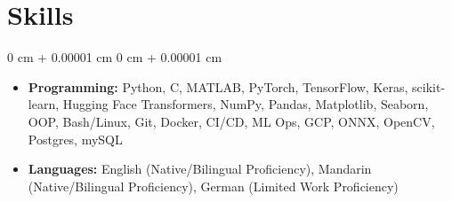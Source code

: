 \documentclass[11pt, letterpaper]{article}
\newenvironment{highlights}{
    \begin{itemize}[
        topsep=0.08 cm,
        parsep=0.08 cm,
        partopsep=0pt,
        itemsep=0pt,
        leftmargin=0.2 cm + 17pt
    ]
}
{
    \end{itemize}
}
\newenvironment{onecolentry}{
    \begin{adjustwidth}{
        0 cm + 0.00001 cm
    }{
        0 cm + 0.00001 cm
    }
}{
    \end{adjustwidth}
}
\begin{document}
\section{Skills}
\vspace{0.08 cm}
\begin{onecolentry}
    \begin{highlights}
        \item \textbf{Programming:} Python, C, MATLAB, PyTorch, TensorFlow, Keras, scikit-learn, Hugging Face Transformers, NumPy, Pandas, Matplotlib, Seaborn, OOP, Bash/Linux, Git, Docker, CI/CD, ML Ops, GCP, ONNX, OpenCV, Postgres, mySQL
        \item \textbf{Languages:} English (Native/Bilingual Proficiency), Mandarin (Native/Bilingual Proficiency), German (Limited Work Proficiency)
    \end{highlights}
\end{onecolentry}
\end{document}
